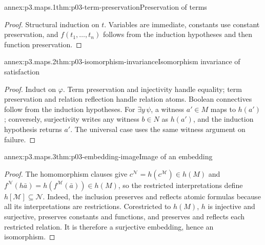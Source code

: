 
\begin{annexitem}{annex:p3.maps.1}{thm:p03-term-preservation}{Preservation of terms}
\begin{proof}
Structural induction on \(t\).  Variables are immediate, constants use
constant preservation, and \(f(t_1,\ldots,t_n)\) follows from the induction
hypotheses and then function preservation.
\end{proof}
\end{annexitem}

\begin{annexitem}{annex:p3.maps.2}{thm:p03-isomorphism-invariance}{Isomorphism invariance of satisfaction}
\begin{proof}
Induct on \(\varphi\).  Term preservation and injectivity handle equality;
term preservation and relation reflection handle relation atoms.  Boolean
connectives follow from the induction hypotheses.  For \(\exists y\,\psi\), a
witness \(a'\in M\) maps to \(h(a')\); conversely, surjectivity writes any
witness \(b\in N\) as \(h(a')\), and the induction hypothesis returns \(a'\).
The universal case uses the same witness argument on failure.
\end{proof}
\end{annexitem}

\begin{annexitem}{annex:p3.maps.3}{thm:p03-embedding-image}{Image of an embedding}
\begin{proof}
The homomorphism clauses give
\(c^{\mathcal N}=h(c^{\mathcal M})\in h(M)\) and
\(f^{\mathcal N}(h\bar a)=h(f^{\mathcal M}(\bar a))\in h(M)\), so the
restricted interpretations define \(h[\mathcal M]\subseteq\mathcal N\).
Indeed, the inclusion preserves and reflects atomic formulas because all its
interpretations are restrictions.
Corestricted to \(h(M)\), \(h\) is injective and surjective, preserves
constants and functions, and preserves and reflects each restricted relation.
It is therefore a surjective embedding, hence an isomorphism.
\end{proof}
\end{annexitem}

